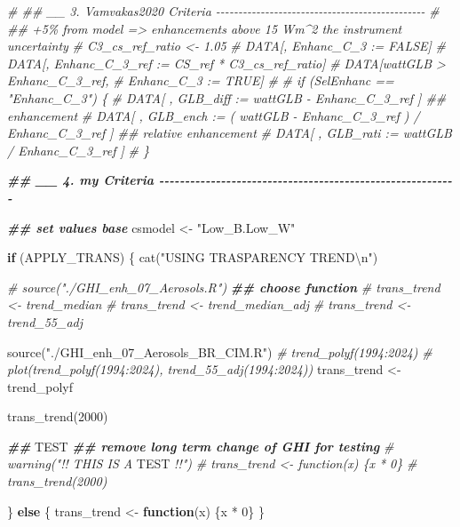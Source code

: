 \documentclass[
  10pt,
  a4paper,oneside]{article}
\newenvironment{Shaded}{\begin{snugshade}}{\end{snugshade}}
\newcommand{\AlertTok}[1]{\textcolor[rgb]{0.94,0.16,0.16}{#1}}
\newcommand{\CommentTok}[1]{\textcolor[rgb]{0.56,0.35,0.01}{\textit{#1}}}
\newcommand{\ControlFlowTok}[1]{\textcolor[rgb]{0.13,0.29,0.53}{\textbf{#1}}}
\newcommand{\DecValTok}[1]{\textcolor[rgb]{0.00,0.00,0.81}{#1}}
\newcommand{\DocumentationTok}[1]{\textcolor[rgb]{0.56,0.35,0.01}{\textbf{\textit{#1}}}}
\newcommand{\FunctionTok}[1]{\textcolor[rgb]{0.00,0.00,0.00}{#1}}
\newcommand{\NormalTok}[1]{#1}
\newcommand{\OtherTok}[1]{\textcolor[rgb]{0.56,0.35,0.01}{#1}}
\newcommand{\SpecialCharTok}[1]{\textcolor[rgb]{0.00,0.00,0.00}{#1}}
\newcommand{\StringTok}[1]{\textcolor[rgb]{0.31,0.60,0.02}{#1}}
\begin{document}
\begin{Shaded}
\begin{Highlighting}[]
\CommentTok{\# \#\# \_\_ 3. Vamvakas2020  Criteria  {-}{-}{-}{-}{-}{-}{-}{-}{-}{-}{-}{-}{-}{-}{-}{-}{-}{-}{-}{-}{-}{-}{-}{-}{-}{-}{-}{-}{-}{-}{-}{-}{-}{-}{-}{-}{-}{-}{-}{-}{-}{-}{-}{-}{-}{-}{-}}
\CommentTok{\# \#\# +5\% from model =\textgreater{} enhancements above 15 Wm\^{}2 the instrument uncertainty}
\CommentTok{\# C3\_cs\_ref\_ratio \textless{}{-} 1.05}
\CommentTok{\# DATA[, Enhanc\_C\_3 := FALSE]}
\CommentTok{\# DATA[, Enhanc\_C\_3\_ref := CS\_ref * C3\_cs\_ref\_ratio]}
\CommentTok{\# DATA[wattGLB \textgreater{} Enhanc\_C\_3\_ref,}
\CommentTok{\#      Enhanc\_C\_3 := TRUE]}
\CommentTok{\#}
\CommentTok{\# if (SelEnhanc == "Enhanc\_C\_3") \{}
\CommentTok{\#   DATA[ , GLB\_diff :=   wattGLB {-} Enhanc\_C\_3\_ref                    ] \#\# enhancement}
\CommentTok{\#   DATA[ , GLB\_ench := ( wattGLB {-} Enhanc\_C\_3\_ref ) / Enhanc\_C\_3\_ref ] \#\# relative enhancement}
\CommentTok{\#   DATA[ , GLB\_rati :=   wattGLB / Enhanc\_C\_3\_ref                    ]}
\CommentTok{\# \}}



\DocumentationTok{\#\# \_\_ 4. my Criteria  {-}{-}{-}{-}{-}{-}{-}{-}{-}{-}{-}{-}{-}{-}{-}{-}{-}{-}{-}{-}{-}{-}{-}{-}{-}{-}{-}{-}{-}{-}{-}{-}{-}{-}{-}{-}{-}{-}{-}{-}{-}{-}{-}{-}{-}{-}{-}{-}{-}{-}{-}{-}{-}{-}{-}{-}{-}{-}}

\DocumentationTok{\#\# set values base}
\NormalTok{csmodel }\OtherTok{\textless{}{-}} \StringTok{"Low\_B.Low\_W"}



\ControlFlowTok{if}\NormalTok{ (APPLY\_TRANS) \{}
  \FunctionTok{cat}\NormalTok{(}\StringTok{"USING TRASPARENCY TREND}\SpecialCharTok{\textbackslash{}n}\StringTok{"}\NormalTok{)}

  \CommentTok{\# source("./GHI\_enh\_07\_Aerosols.R")}
  \DocumentationTok{\#\# choose function}
  \CommentTok{\# trans\_trend \textless{}{-} trend\_median}
  \CommentTok{\# trans\_trend \textless{}{-} trend\_median\_adj}
  \CommentTok{\# trans\_trend \textless{}{-} trend\_55\_adj}

  \FunctionTok{source}\NormalTok{(}\StringTok{"./GHI\_enh\_07\_Aerosols\_BR\_CIM.R"}\NormalTok{)}
  \CommentTok{\# trend\_polyf(1994:2024)}
  \CommentTok{\# plot(trend\_polyf(1994:2024), trend\_55\_adj(1994:2024))}
\NormalTok{  trans\_trend }\OtherTok{\textless{}{-}}\NormalTok{ trend\_polyf}

  \FunctionTok{trans\_trend}\NormalTok{(}\DecValTok{2000}\NormalTok{)}

  \DocumentationTok{\#\# }\AlertTok{TEST}
  \DocumentationTok{\#\# remove long term change of GHI for testing}
  \CommentTok{\# warning("!! THIS IS A }\AlertTok{TEST}\CommentTok{ !!")}
  \CommentTok{\# trans\_trend \textless{}{-} function(x) \{x * 0\}}
  \CommentTok{\# trans\_trend(2000)}

\NormalTok{\} }\ControlFlowTok{else}\NormalTok{ \{}
\NormalTok{  trans\_trend }\OtherTok{\textless{}{-}} \ControlFlowTok{function}\NormalTok{(x) \{x }\SpecialCharTok{*} \DecValTok{0}\NormalTok{\}}
\NormalTok{\}}
\end{Highlighting}
\end{Shaded}
\end{document}
